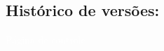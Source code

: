 \begin{pretextualblock}
	
	

\chapter*{Histórico de versões:}

	


\newpage
\pagestyle{empty} 




\newpage
\pagestyle{empty} 





\newpage
\pagestyle{empty} 

		
\newpage
\pagestyle{empty}      %
\textcolor{white}{Página de controle}
\newpage


\end{pretextualblock}
